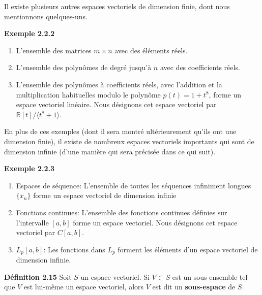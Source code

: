 \documentclass[10pt,twoside,a4paper]{book}
\begin{document}
\noindent
Il existe plusieurs autres espaces vectoriels de dimension finie, dont nous mentionnons quelques-uns.
\vspace{4mm}

\noindent
\textbf{Exemple 2.2.2}

\begin{enumerate}
  \item L'ensemble des matrices $m \times n$ avec des éléments réels.
  \item L'ensemble des polynômes de degré jusqu'à $n$ avec des coefficients réels.
  \item L'ensemble des polynômes à coefficients réels, avec l'addition et la multiplication habituelles modulo le polynôme $p(t) = 1 + t^8$, forme un espace vectoriel linéaire. 
  Nous désignons cet espace vectoriel par $\mathbb{R}[t]/ \langle t^8 + 1 \rangle$.
\end{enumerate}
\vspace{4mm}

\noindent
En plus de ces exemples (dont il sera montré ultérieurement qu'ils ont une dimension finie), il existe de nombreux espaces vectoriels importants qui sont de dimension infinie (d'une manière qui sera précisée dans ce qui suit).

\vspace{4mm}
\noindent
\textbf{Exemple 2.2.3}

\begin{enumerate}
  \item Espaces de séquence: L'ensemble de toutes les séquences infiniment longues $\{x_n\}$ forme un espace vectoriel de dimension infinie
  \item Fonctions continues: L'ensemble des fonctions continues définies sur l'intervalle $[a, b]$ forme un espace vectoriel. Nous désignons cet espace vectoriel par $C[a, b]$.
  \item $L_p[a, b]$: Les fonctions dans $L_p$ forment les éléments d'un espace vectoriel de dimension infinie.
\end{enumerate}

\vspace{4mm}
\noindent
\textbf{Définition 2.15} Soit $S$ un espace vectoriel. Si $V \subset S$ est un sous-ensemble tel que $V$ est lui-même un espace vectoriel, alors $V$ est dit un \textbf{sous-espace} de $S$.
\end{document}
